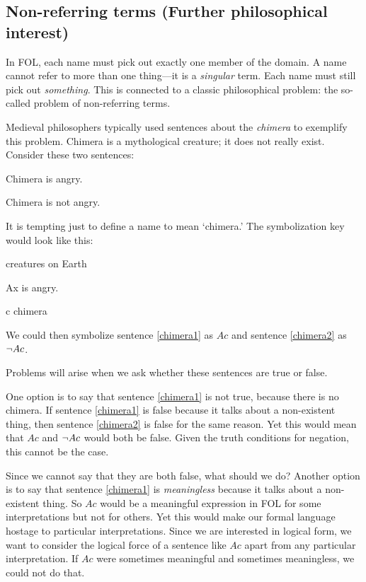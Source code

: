\subsection{Non-referring terms {\textnormal (Further philosophical interest)}}

In FOL, each name must pick out exactly one member of the domain. A name cannot refer to more than one thing---it is a \emph{singular} term. Each name must still pick out \emph{something}. This is connected to a classic philosophical problem: the so-called problem of non-referring terms.

Medieval philosophers typically used sentences about the \emph{chimera} to exemplify this problem. Chimera is a mythological creature; it does not really exist. Consider these two sentences:
\begin{earg}
\item[\ex{chimera1}] Chimera is angry.
\item[\ex{chimera2}] Chimera is not angry.
\end{earg}
It is tempting just to define a name to mean `chimera.' The symbolization key would look like this:
\begin{ekey}
\item[\text{domain}] creatures on Earth
\item[Ax]  is angry.
\item[c] chimera
\end{ekey}
We could then symbolize sentence \ref{chimera1} as $Ac$ and sentence \ref{chimera2} as $\neg Ac$.

Problems will arise when we ask whether these sentences are true or false.

One option is to say that sentence \ref{chimera1} is not true, because there is no chimera. If sentence \ref{chimera1} is false because it talks about a non-existent thing, then sentence \ref{chimera2} is false for the same reason. Yet this would mean that $Ac$ and $\neg Ac$ would both be false. Given the truth conditions for negation, this cannot be the case.

Since we cannot say that they are both false, what should we do? Another option is to say that sentence \ref{chimera1} is \emph{meaningless} because it talks about a non-existent thing. So $Ac$ would be a meaningful expression in FOL for some interpretations but not for others. Yet this would make our formal language hostage to particular interpretations. Since we are interested in logical form, we want to consider the logical force of a sentence like $Ac$ apart from any particular interpretation. If $Ac$ were sometimes meaningful and sometimes meaningless, we could not do that.

